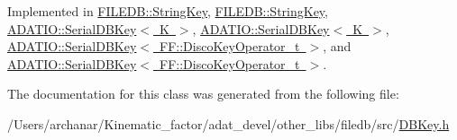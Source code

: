 Implemented in \mbox{\hyperlink{classFILEDB_1_1StringKey_afb2fa99d53c0f4b5aeca0377228ea722}{F\+I\+L\+E\+D\+B\+::\+String\+Key}}, \mbox{\hyperlink{classFILEDB_1_1StringKey_afb2fa99d53c0f4b5aeca0377228ea722}{F\+I\+L\+E\+D\+B\+::\+String\+Key}}, \mbox{\hyperlink{classADATIO_1_1SerialDBKey_ae8926cd9bdef006f3729f4b724a2e2fe}{A\+D\+A\+T\+I\+O\+::\+Serial\+D\+B\+Key$<$ K $>$}}, \mbox{\hyperlink{classADATIO_1_1SerialDBKey_ae8926cd9bdef006f3729f4b724a2e2fe}{A\+D\+A\+T\+I\+O\+::\+Serial\+D\+B\+Key$<$ K $>$}}, \mbox{\hyperlink{classADATIO_1_1SerialDBKey_ae8926cd9bdef006f3729f4b724a2e2fe}{A\+D\+A\+T\+I\+O\+::\+Serial\+D\+B\+Key$<$ F\+F\+::\+Disco\+Key\+Operator\+\_\+t $>$}}, and \mbox{\hyperlink{classADATIO_1_1SerialDBKey_ae8926cd9bdef006f3729f4b724a2e2fe}{A\+D\+A\+T\+I\+O\+::\+Serial\+D\+B\+Key$<$ F\+F\+::\+Disco\+Key\+Operator\+\_\+t $>$}}.



The documentation for this class was generated from the following file\+:\begin{DoxyCompactItemize}
\item 
/\+Users/archanar/\+Kinematic\+\_\+factor/adat\+\_\+devel/other\+\_\+libs/filedb/src/\mbox{\hyperlink{other__libs_2filedb_2src_2DBKey_8h}{D\+B\+Key.\+h}}\end{DoxyCompactItemize}
